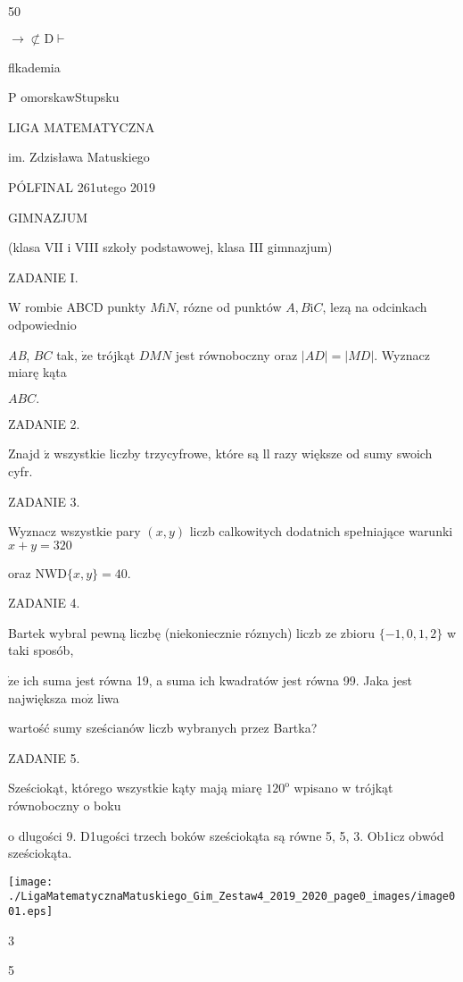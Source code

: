 \documentclass[a4paper,12pt]{article}
\begin{document}
50

$\rightarrow\not\subset \mathrm{D}\vdash$

flkademia

P omorskawStupsku

LIGA MATEMATYCZNA

im. Zdzisława Matuskiego

PÓLFINAL 261utego 2019

GIMNAZJUM

(klasa VII i VIII szkoły podstawowej, klasa III gimnazjum)

ZADANIE I.

$\mathrm{W}$ rombie ABCD punkty $M\mathrm{i}N$, rózne od punktów $A, B\mathrm{i}C$, lezą na odcinkach odpowiednio

{\it AB}, $BC$ tak, $\dot{\mathrm{z}}\mathrm{e}$ trójkąt $DMN$ jest równoboczny oraz $|AD| = |MD|$. Wyznacz miarę kąta

$ABC.$

ZADANIE 2.

Znajd $\acute{\mathrm{z}}$ wszystkie liczby trzycyfrowe, które są ll razy większe od sumy swoich cyfr.

ZADANIE 3.

Wyznacz wszystkie pary $(x,y)$ liczb calkowitych dodatnich spełniające warunki $x+y=320$

oraz $\mathrm{N}\mathrm{W}\mathrm{D}\{x,y\}=40.$

ZADANIE 4.

Bartek wybral pewną liczbę (niekoniecznie róznych) liczb ze zbioru $\{-1,0,1,2\}$ w taki sposób,

$\dot{\mathrm{z}}\mathrm{e}$ ich suma jest równa 19, a suma ich kwadratów jest równa 99. Jaka jest największa $\mathrm{m}\mathrm{o}\dot{\mathrm{z}}$ liwa

wartość sumy sześcianów liczb wybranych przez Bartka?

ZADANIE 5.

Sześciokąt, którego wszystkie kąty mają miarę $120^{\mathrm{o}}$ wpisano w trójkąt równoboczny o boku

o dlugości 9. D1ugości trzech boków sześciokąta są równe 5, 5, 3. Ob1icz obwód sześciokąta.
\begin{center}
\texttt{[image: ./LigaMatematycznaMatuskiego\_Gim\_Zestaw4\_2019\_2020\_page0\_images/image001.eps]}
\end{center}
3

5
\end{document}
